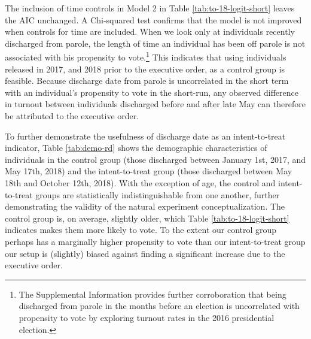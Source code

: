\documentclass[
  12pt,
]{article}
\begin{document}
The inclusion of time controls in Model 2 in Table \ref{tab:to-18-logit-short} leaves the AIC unchanged. A Chi-squared test confirms that the model is not improved when controls for time are included. When we look only at individuals recently discharged from parole, the length of time an individual has been off parole is not associated with his propensity to vote.\footnote{The Supplemental Information provides further corroboration that being discharged from parole in the months before an election is uncorrelated with propensity to vote by exploring turnout rates in the 2016 presidential election.} This indicates that using individuals released in 2017, and 2018 prior to the executive order, as a control group is feasible. Because discharge date from parole is uncorrelated in the short term with an individual's propensity to vote in the short-run, any observed difference in turnout between individuals discharged before and after late May can therefore be attributed to the executive order.

To further demonstrate the usefulness of discharge date as an intent-to-treat indicator, Table \ref{tab:demo-rd} shows the demographic characteristics of individuals in the control group (those discharged between January 1st, 2017, and May 17th, 2018) and the intent-to-treat group (those discharged between May 18th and October 12th, 2018). With the exception of age, the control and intent-to-treat groups are statistically indistinguishable from one another, further demonstrating the validity of the natural experiment conceptualization. The control group is, on average, slightly older, which Table \ref{tab:to-18-logit-short} indicates makes them more likely to vote. To the extent our control group perhaps has a marginally higher propensity to vote than our intent-to-treat group our setup is (slightly) biased against finding a significant increase due to the executive order.
\end{document}
